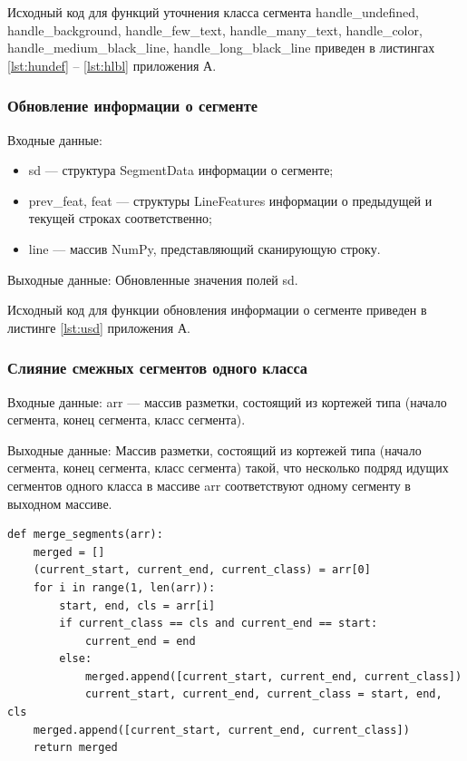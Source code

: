 Исходный код для функций уточнения класса сегмента handle\_undefined, handle\_background, handle\_few\_text, handle\_many\_text, handle\_color, handle\_medium\_black\_line, handle\_long\_black\_line приведен в листингах \ref{lst:hundef} -- \ref{lst:hlbl} приложения А.

\subsubsection{Обновление информации о сегменте} %
Входные данные:
\begin{itemize}
    \item sd --- структура SegmentData информации о сегменте;
    \item prev\_feat, feat --- структуры LineFeatures информации о предыдущей и текущей строках соответственно;
    \item line --- массив NumPy, представляющий сканирующую строку.
\end{itemize}

Выходные данные: Обновленные значения полей sd.

Исходный код для функции обновления информации о сегменте приведен в листинге \ref{lst:usd} приложения А.

\subsubsection{Слияние смежных сегментов одного класса} %
Входные данные: arr --- массив разметки, состоящий из кортежей типа (начало сегмента, конец сегмента, класс сегмента).

Выходные данные: Массив разметки, состоящий из кортежей типа (начало сегмента, конец сегмента, класс сегмента) такой, что несколько подряд идущих сегментов одного класса в массиве arr соответствуют одному сегменту в выходном массиве.

\begin{lstlisting}[caption={Слияние смежных сегментов одного класса в один}, label={}]
def merge_segments(arr):
    merged = []
    (current_start, current_end, current_class) = arr[0]
    for i in range(1, len(arr)):
        start, end, cls = arr[i]
        if current_class == cls and current_end == start:
            current_end = end
        else:
            merged.append([current_start, current_end, current_class])
            current_start, current_end, current_class = start, end, cls
    merged.append([current_start, current_end, current_class])
    return merged
\end{lstlisting}

